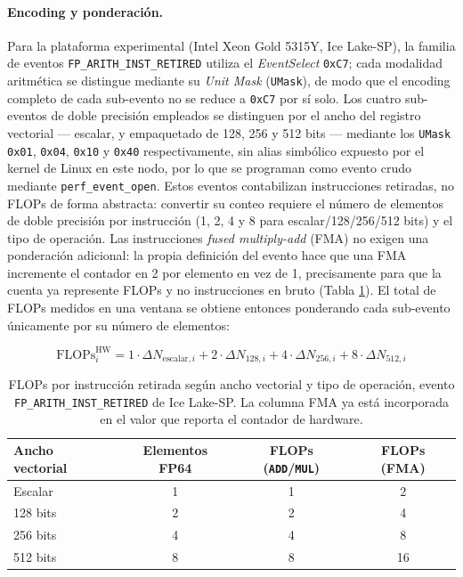 \documentclass[12pt,oneside,spanish]{book}
\begin{document}
\paragraph{Encoding y ponderación.} Para la plataforma experimental (Intel Xeon Gold 5315Y, Ice Lake-SP), la familia de eventos \texttt{FP\_ARITH\_INST\_RETIRED} utiliza el \textit{EventSelect} \texttt{0xC7}; cada modalidad aritmética se distingue mediante su \textit{Unit Mask} (\texttt{UMask}), de modo que el encoding completo de cada sub-evento no se reduce a \texttt{0xC7} por sí solo. Los cuatro sub-eventos de doble precisión empleados se distinguen por el ancho del registro vectorial --- escalar, y empaquetado de 128, 256 y 512 bits --- mediante los \texttt{UMask} \texttt{0x01}, \texttt{0x04}, \texttt{0x10} y \texttt{0x40} respectivamente, sin alias simbólico expuesto por el kernel de Linux en este nodo, por lo que se programan como evento crudo mediante \texttt{perf\_event\_open}. Estos eventos contabilizan instrucciones retiradas, no FLOPs de forma abstracta: convertir su conteo requiere el número de elementos de doble precisión por instrucción (1, 2, 4 y 8 para escalar/128/256/512 bits) y el tipo de operación. Las instrucciones \textit{fused multiply-add} (FMA) no exigen una ponderación adicional: la propia definición del evento hace que una FMA incremente el contador en 2 por elemento en vez de 1, precisamente para que la cuenta ya represente FLOPs y no instrucciones en bruto \cite{IntelPerfmon2026} (Tabla \ref{tab:fma-pesos}). El total de FLOPs medidos en una ventana se obtiene entonces ponderando cada sub-evento únicamente por su número de elementos:

\begin{equation}
\text{FLOPs}_{i}^{\text{HW}} = 1 \cdot \Delta N_{\text{escalar},i} + 2 \cdot \Delta N_{128,i} + 4 \cdot \Delta N_{256,i} + 8 \cdot \Delta N_{512,i}
\label{eq:flops-medidos}
\end{equation}

\begin{table}[h]
\centering
\caption{FLOPs por instrucción retirada según ancho vectorial y tipo de operación, evento \texttt{FP\_ARITH\_INST\_RETIRED} de Ice Lake-SP. La columna FMA ya está incorporada en el valor que reporta el contador de hardware.}
\label{tab:fma-pesos}
\begin{tabular}{@{}lccc@{}}
\toprule
Ancho vectorial & Elementos FP64 & FLOPs (\texttt{ADD}/\texttt{MUL}) & FLOPs (FMA) \\
\midrule
Escalar   & 1 & 1 & 2 \\
128 bits  & 2 & 2 & 4 \\
256 bits  & 4 & 4 & 8 \\
512 bits  & 8 & 8 & 16 \\
\bottomrule
\end{tabular}
\end{table}
\end{document}
